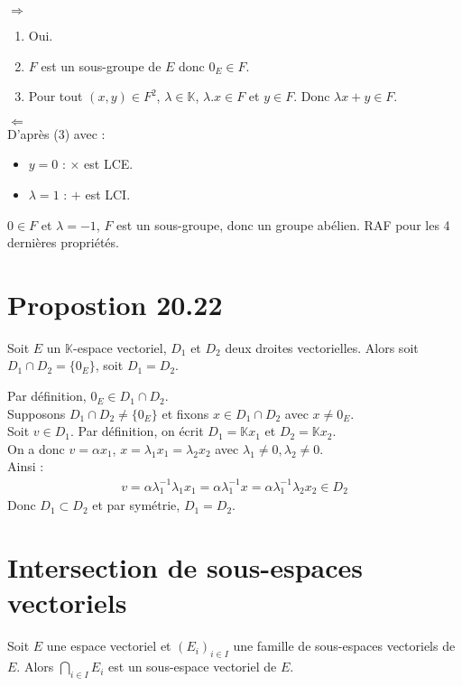 \documentclass[../main.tex]{subfiles}
\begin{document}
$\boxed{\Rightarrow}$
\begin{enumerate}
    \item Oui. 
    \item $F$ est un sous-groupe de $E$ donc $0_E \in F$. 
    \item Pour tout $(x, y) \in F^2$, $\lambda \in \mathbb{K}$, $\lambda .x \in F$ et $y \in F$. Donc $\lambda x + y \in F$.
\end{enumerate}

$\boxed{\Leftarrow}$ \\
D'après (3) avec : 
\begin{itemize}
    \item $y = 0$ : $\times$ est LCE. 
    \item $\lambda = 1$ : $+$ est LCI. 
\end{itemize}
$0\in F$ et $\lambda = -1$, $F$ est un sous-groupe, donc un groupe abélien.
RAF pour les 4 dernières propriétés.

\section{Propostion 20.22}
\begin{tcolorbox}[title=Propostion 20.22, title filled=false, colframe=lightblue, colback=lightblue!10!white]
    Soit $E$ un $\mathbb{K}$-espace vectoriel, $D_1$ et $D_2$ deux droites vectorielles. Alors soit $D_1 \cap D_2 = \{ 0_E \}$, soit $D_1 = D_2$. 
\end{tcolorbox}

\noindent Par définition, $0_E \in D_1 \cap D_2$. \\
Supposons $D_1 \cap D_2 \neq \{ 0_E \}$ et fixons $x \in D_1 \cap D_2$ avec $x \neq 0_E$. \\
Soit $v\in D_1$. Par définition, on écrit $D_1 = \mathbb{K} x_1$ et $D_2 = \mathbb{K} x_2$. \\
On a donc $v = \alpha x_1$, $x = \lambda_1 x_1 = \lambda_2 x_2$ avec $\lambda_1 \neq 0, \lambda_2 \neq 0$. \\
Ainsi : 
\begin{align*}
    v = \alpha \lambda_1^{-1} \lambda_1 x_1 = \alpha \lambda_1^{-1} x = \alpha \lambda_1^{-1} \lambda_2 x_2 \in D_2
\end{align*}
Donc $D_1 \subset D_2$ et par symétrie, $\boxed{D_1 = D_2}$.

\section{Intersection de sous-espaces vectoriels}
\begin{tcolorbox}[title=Propostion 20.27, title filled=false, colframe=lightblue, colback=lightblue!10!white]
    Soit $E$ une espace vectoriel et $(E_i)_{i\in I}$ une famille de sous-espaces vectoriels de $E$. Alors $\bigcap\limits_{i\in I} E_i$ est un sous-espace vectoriel de $E$.
\end{tcolorbox}
\end{document}
